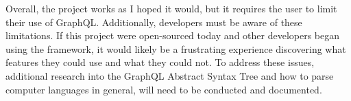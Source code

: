 Overall, the project works as I hoped it would, but it requires the user to limit their use of GraphQL.  Additionally, developers must be aware of these limitations.  If this project were open-sourced today and other developers began using the framework, it would likely be a frustrating experience discovering what features they could use and what they could not.  To address these issues, additional research into the GraphQL Abstract Syntax Tree and how to parse computer languages in general, will need to be conducted and documented.